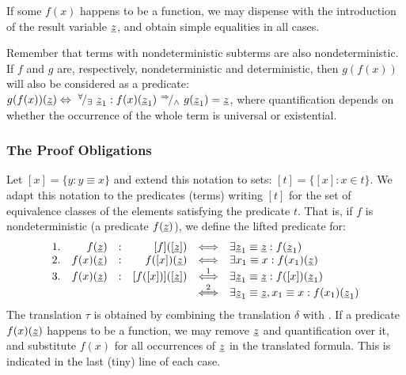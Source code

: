 If some $f(x)$ happens to be a function, we may dispense with the introduction
of the result variable $\underline{z}$, and obtain simple equalities in all cases. 

Remember that terms with nondeterministic subterms are also nondeterministic. If $f$ and $g$ are, respectively, nondeterministic and deterministic, then $g(f(x))$ will also be considered as a predicate: $g(f(x))(\underline{z})\mathrel{\Leftrightarrow} \ ^{\forall}\!/_{\exists}\  \underline{z}_1:f(x)(\underline{z}_1)\ ^{\mathrel\Rightarrow}\!/_{\land}\  g(\underline{z}_1)=\underline{z}$, where quantification depends on whether the occurrence of the whole term is universal or existential.
\subsubsection{The Proof Obligations}
Let $[x]=\{y:y\equiv x\}$ and extend this notation to sets: $[t]=\{[x]:x\in t\}.$ We adapt this notation to the predicates (terms) writing
$[t]$ for the set of equivalence classes of the elements satisfying the predicate $t$. That is, if $f$ is nondeterministic (a predicate $f(\underline{z})$), we define the lifted predicate for:
\begin{equation}\label{eq:lift}
\begin{array}{rrcrcl}
1. & f(\underline{z}) & : & [f]([\underline{z}]) & \mathrel{\Longleftrightarrow} & \exists \underline{z}_1\equiv \underline{z}: f(\underline{z}_1) \\
2. & f(x)(\underline{z}) & : & f([x])(\underline{z}) & \mathrel{\Longleftrightarrow} & \exists x_1\equiv x: f(x_1)(\underline{z}) \\
3. & f(x)(\underline{z}) & : & [f([x])]([\underline{z}]) & \mathbin{\stackrel{1}{\Longleftrightarrow}} & \exists \underline{z}_1\equiv \underline{z}: f([x])(\underline{z}_1) \\ 
& & & & \mathbin{\stackrel{2}{\Longleftrightarrow}} & \exists \underline{z}_1\equiv \underline{z}, x_1\equiv x: f(x_1)(\underline{z}_1) \end{array}
\end{equation}
The translation $\tau$
is obtained by combining the translation $\delta$ with . If a predicate $f(x)(\underline{z})$ happens to be a function, we may remove $\underline{z}$ and quantification over it, and substitute $f(x)$ for all occurrences of $\underline{z}$ in the translated formula. This is indicated in the last (tiny) line
of each case.
